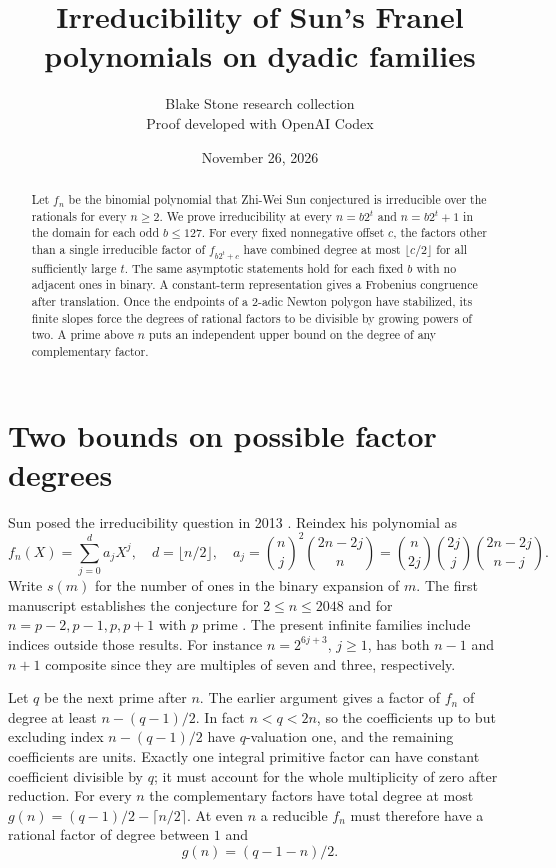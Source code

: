 \documentclass[11pt]{article}
\title{Irreducibility of Sun's Franel polynomials on dyadic families}
\author{Blake Stone research collection\\\small Proof developed with OpenAI Codex}
\date{November 26, 2026}
\begin{document}
\maketitle
\begin{abstract}
Let $f_n$ be the binomial polynomial that Zhi-Wei Sun conjectured is irreducible over the rationals for every $n\ge2$. We prove irreducibility at every $n=b2^t$ and $n=b2^t+1$ in the domain for each odd $b\le127$. For every fixed nonnegative offset $c$, the factors other than a single irreducible factor of $f_{b2^t+c}$ have combined degree at most $\lfloor c/2\rfloor$ for all sufficiently large $t$. The same asymptotic statements hold for each fixed $b$ with no adjacent ones in binary. A constant-term representation gives a Frobenius congruence after translation. Once the endpoints of a 2-adic Newton polygon have stabilized, its finite slopes force the degrees of rational factors to be divisible by growing powers of two. A prime above $n$ puts an independent upper bound on the degree of any complementary factor.
\end{abstract}

\section{Two bounds on possible factor degrees}
Sun posed the irreducibility question in 2013 \cite{sun}. Reindex his polynomial as
\[
 f_n(X)=\sum_{j=0}^{d} a_j X^j,\quad d=\lfloor n/2\rfloor,\quad
 a_j=\binom nj^2\binom{2n-2j}n
 =\binom n{2j}\binom{2j}j\binom{2n-2j}{n-j}.
\]
Write $s(m)$ for the number of ones in the binary expansion of $m$. The first manuscript establishes the conjecture for $2\le n\le2048$ and for $n=p-2,p-1,p,p+1$ with $p$ prime \cite{first}. The present infinite families include indices outside those results. For instance $n=2^{6j+3}$, $j\ge1$, has both $n-1$ and $n+1$ composite since they are multiples of seven and three, respectively.

Let $q$ be the next prime after $n$. The earlier argument gives a factor of $f_n$ of degree at least $n-(q-1)/2$. In fact $n<q<2n$, so the coefficients up to but excluding index $n-(q-1)/2$ have $q$-valuation one, and the remaining coefficients are units. Exactly one integral primitive factor can have constant coefficient divisible by $q$; it must account for the whole multiplicity of zero after reduction. For every $n$ the complementary factors have total degree at most $g(n)=(q-1)/2-\lceil n/2\rceil$. At even $n$ a reducible $f_n$ must therefore have a rational factor of degree between $1$ and
\begin{equation} g(n)=(q-1-n)/2. \label{gap}\end{equation}
\end{document}
